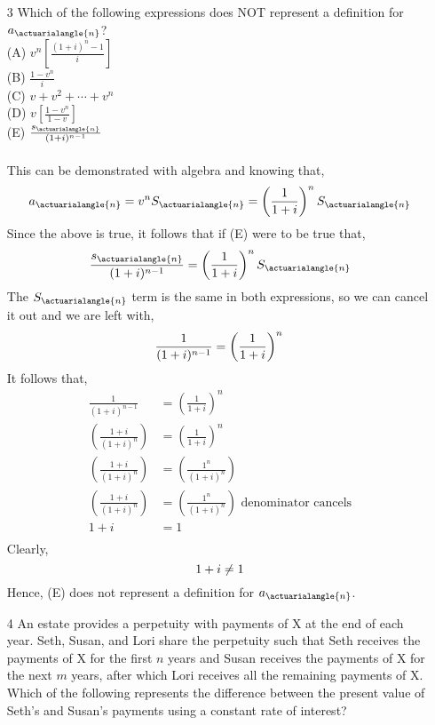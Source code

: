 \documentclass[10pt]{article}
\begin{document}
\begin{enumerate}
\pagebreak


  \item [3] Which of the following expressions does NOT represent a definition for $a_{\actuarialangle{n}}$?\\

(A) $v^{n}\left[\frac{(1+i)^{n}-1}{i}\right]$\\
(B) $\frac{1-v^{n}}{i}$\\
(C) $v+v^{2}+\cdots+v^{n}$\\
(D) $v\left[\frac{1-v^{n}}{1-v}\right]$\\
(E) $\frac{s_{\actuarialangle{n}}}{(1+i)^{n-1}}$\\

\\

This can be demonstrated with algebra and knowing that,
$$
a_{\actuarialangle{n}} = v^nS_{\actuarialangle{n}} = \left(\frac{1}{1+i}\right)^nS_{\actuarialangle{n}}\\
$$
Since the above is true, it follows that if (E) were to be true that,
$$
\frac{s_{\actuarialangle{n}}}{(1+i)^{n-1}} = \left(\frac{1}{1+i}\right)^nS_{\actuarialangle{n}}\\
$$
The $S_{\actuarialangle{n}}$ term is the same in both expressions, so we can cancel it out and we are left with,
$$
\frac{1}{(1+i)^{n-1}} = \left(\frac{1}{1+i}\right)^n\\
$$
It follows that,
\begin{align*}
	{\frac{1}{(1+i)^{n-1}}} &= \left(\frac{1}{1+i}\right)^n\\
	\left(\frac{1+i}{(1+i)^n}\right) &= \left(\frac{1}{1+i}\right)^n\\
	\left(\frac{1+i}{(1+i)^n}\right) &= \left(\frac{1^n}{(1+i)^n}\right)\\
	\left(\frac{1+i}{(1+i)^n}\right) &= \left(\frac{1^n}{(1+i)^n}\right) \text{ denominator cancels}\\
	1+i &= 1\\
\end{align*}
Clearly,
$$1+i \neq 1\\$$
Hence,
(E) does not represent a definition for $a_{\actuarialangle{n}}$.

 
\pagebreak

  \item [4] An estate provides a perpetuity with payments of $\mathrm{X}$ at the end of each year. Seth, Susan, and Lori share the perpetuity such that Seth receives the payments of $\mathrm{X}$ for the first $n$ years and Susan receives the payments of $\mathrm{X}$ for the next $m$ years, after which Lori receives all the remaining payments of $\mathrm{X}$. Which of the following represents the difference between the present value of Seth's and Susan's payments using a constant rate of interest?\\


\end{enumerate}
\end{document}
